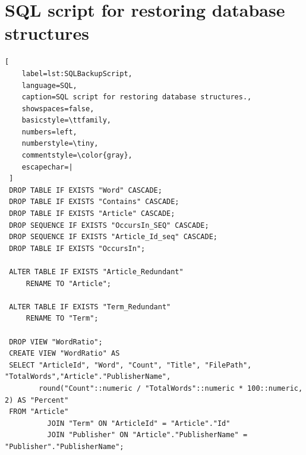 \chapter{SQL script for restoring database structures}\label{SQLBackupScript}
\begin{lstlisting}[
    label=lst:SQLBackupScript,
    language=SQL,
    caption=SQL script for restoring database structures.,
    showspaces=false,
    basicstyle=\ttfamily,
    numbers=left,
    numberstyle=\tiny,
    commentstyle=\color{gray},
    escapechar=|
 ]
 DROP TABLE IF EXISTS "Word" CASCADE;
 DROP TABLE IF EXISTS "Contains" CASCADE;
 DROP TABLE IF EXISTS "Article" CASCADE;
 DROP SEQUENCE IF EXISTS "OccursIn_SEQ" CASCADE;
 DROP SEQUENCE IF EXISTS "Article_Id_seq" CASCADE;
 DROP TABLE IF EXISTS "OccursIn";
 
 ALTER TABLE IF EXISTS "Article_Redundant"
     RENAME TO "Article";
 
 ALTER TABLE IF EXISTS "Term_Redundant"
     RENAME TO "Term";
 
 DROP VIEW "WordRatio";
 CREATE VIEW "WordRatio" AS
 SELECT "ArticleId", "Word", "Count", "Title", "FilePath", "TotalWords","Article"."PublisherName",
        round("Count"::numeric / "TotalWords"::numeric * 100::numeric, 2) AS "Percent"
 FROM "Article"
          JOIN "Term" ON "ArticleId" = "Article"."Id"
          JOIN "Publisher" ON "Article"."PublisherName" = "Publisher"."PublisherName";
\end{lstlisting}